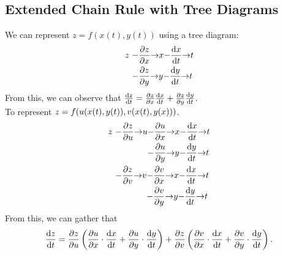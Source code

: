 \documentclass{report}
\begin{document}
\subsection*{Extended Chain Rule with Tree Diagrams}
We can represent $z=f(x(t), y(t))$ using a tree diagram:
\begin{align*}
	z\ &{-} \del{z}{x} {\rightarrow} x {-} \dyd[x]{t} {\rightarrow} t \\
	\phantom{z}\ &{-} \del{z}{y} {\rightarrow} y {-} \dyd[y]{t} {\rightarrow} t \\
\end{align*}
From this, we can observe that $\dyd[z]{t} = \del{z}{x}\dyd[x]{t} + \del{z}{y}\dyd[y]{t}$.\\

\pagebreak
To represent $\dps{z = f(u(x(t), y(t)), v(x(t), y(x)))}$.
\begin{align*}
	z\ &{-} \del{z}{u}{\rightarrow} u {-} \del{u}{x}{\rightarrow} x {-} \dyd[x]{t} {\rightarrow} t \\
	\phantom{z}\ &\phantom{{-} \del{z}{u}{\rightarrow} u}{-}\del{u}{y}{\rightarrow}y {-} \dyd[y]{t} {\rightarrow} t \\
	\phantom{z}\ &{-} \del{z}{v}{\rightarrow} v {-} \del{v}{x}{\rightarrow} x {-} \dyd[x]{t} {\rightarrow} t \\
	\phantom{z}\ &\phantom{{-} \del{z}{v}{\rightarrow} v}{-}\del{v}{y}{\rightarrow}y {-} \dyd[y]{t} {\rightarrow} t \\
\end{align*}
From this, we can gather that
$$	
	\dyd[z]{t} = \del{z}{u}\bracks{\del{u}{x}\cd\dyd[x]{t} + \del{u}{y}\cd\dyd[y]{t}} + \del{z}{v}\bracks{\del{v}{x}\cd\dyd[x]{t} + \del{v}{y}\cd\dyd[y]{t}}.
$$
\end{document}
